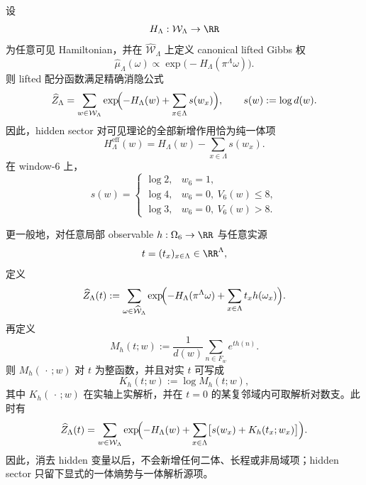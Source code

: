 \begin{theorem}[三层局域熵势与源项整化]\label{thm:xi-time-part9z-window6-local-entropy-source-renormalization}
设
\[
H_\Lambda:\mathcal W_\Lambda\to \RR
\]
为任意可见 Hamiltonian，并在 \(\widehat{\mathcal W}_\Lambda\) 上定义 canonical lifted Gibbs 权
\[
\widehat\mu_\Lambda(\omega)
\propto
\exp\!\bigl(-H_\Lambda(\pi^\Lambda\omega)\bigr).
\]
则 lifted 配分函数满足精确消隐公式
\[
\widehat Z_\Lambda
=
\sum_{w\in\mathcal W_\Lambda}
\exp\!\Bigl(
-H_\Lambda(w)+\sum_{x\in\Lambda}s(w_x)
\Bigr),
\qquad
s(w):=\log d(w).
\]
因此，hidden sector 对可见理论的全部新增作用恰为纯一体项
\[
H_\Lambda^{\mathrm{eff}}(w)
=
H_\Lambda(w)-\sum_{x\in\Lambda}s(w_x).
\]
在 window-\(6\) 上，
\[
s(w)=
\begin{cases}
\log 2,& w_6=1,\\[4pt]
\log 4,& w_6=0,\ V_6(w)\le 8,\\[4pt]
\log 3,& w_6=0,\ V_6(w)>8.
\end{cases}
\]

更一般地，对任意局部 observable \(h:\Omega_6\to\RR\) 与任意实源
\[
t=(t_x)_{x\in\Lambda}\in\RR^\Lambda,
\]
定义
\[
\widehat Z_\Lambda(t)
:=
\sum_{\omega\in\widehat{\mathcal W}_\Lambda}
\exp\!\Bigl(
-H_\Lambda(\pi^\Lambda\omega)+\sum_{x\in\Lambda}t_x h(\omega_x)
\Bigr).
\]
再定义
\[
M_h(t;w):=
\frac1{d(w)}\sum_{n\in F_w}e^{t h(n)}.
\]
则 \(M_h(\,\cdot\,;w)\) 对 \(t\) 为整函数，并且对实 \(t\) 可写成
\[
K_h(t;w):=\log M_h(t;w),
\]
其中 \(K_h(\,\cdot\,;w)\) 在实轴上实解析，并在 \(t=0\) 的某复邻域内可取解析对数支。此时有
\[
\widehat Z_\Lambda(t)
=
\sum_{w\in\mathcal W_\Lambda}
\exp\!\Bigl(
-H_\Lambda(w)+\sum_{x\in\Lambda}\bigl[s(w_x)+K_h(t_x;w_x)\bigr]
\Bigr).
\]
因此，消去 hidden 变量以后，不会新增任何二体、长程或非局域项；hidden sector 只留下显式的一体熵势与一体解析源项。
\end{theorem}
